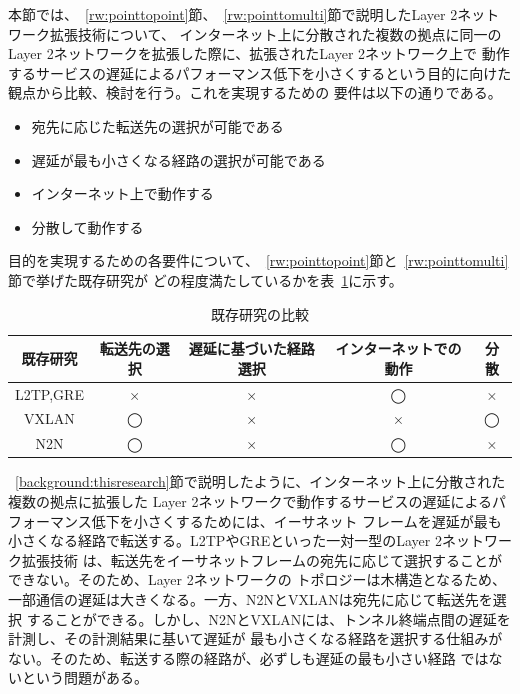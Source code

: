 本節では、~\ref{rw:pointtopoint}節、~\ref{rw:pointtomulti}節で説明したLayer 2ネットワーク拡張技術について、
インターネット上に分散された複数の拠点に同一のLayer 2ネットワークを拡張した際に、拡張されたLayer 2ネットワーク上で
動作するサービスの遅延によるパフォーマンス低下を小さくするという目的に向けた観点から比較、検討を行う。これを実現するための
要件は以下の通りである。

\begin{itemize}
	\item{宛先に応じた転送先の選択が可能である}
	\item{遅延が最も小さくなる経路の選択が可能である}
	\item{インターネット上で動作する}
	\item{分散して動作する}
\end{itemize}

目的を実現するための各要件について、~\ref{rw:pointtopoint}節と~\ref{rw:pointtomulti}節で挙げた既存研究が
どの程度満たしているかを表~\ref{table:relatedworks}に示す。

\begin{table}[h]
	\begin{center}
		\caption{既存研究の比較}
		\begin{tabular}{|c|c|c|c|c|}
			\hline
			既存研究 & 転送先の選択 & 遅延に基づいた経路選択 & インターネットでの動作 & 分散 \\
			\hline
			\hline
			L2TP,GRE & × & × & ◯ & × \\
			VXLAN & ◯ & × & × & ◯ \\
			N2N & ◯ & × & ◯ & × \\
			\hline
		\end{tabular}
		\label{table:relatedworks}
	\end{center}
\end{table}

~\ref{background:thisresearch}節で説明したように、インターネット上に分散された複数の拠点に拡張した
Layer 2ネットワークで動作するサービスの遅延によるパフォーマンス低下を小さくするためには、イーサネット
フレームを遅延が最も小さくなる経路で転送する。L2TPやGREといった一対一型のLayer 2ネットワーク拡張技術
は、転送先をイーサネットフレームの宛先に応じて選択することができない。そのため、Layer 2ネットワークの
トポロジーは木構造となるため、一部通信の遅延は大きくなる。一方、N2NとVXLANは宛先に応じて転送先を選択
することができる。しかし、N2NとVXLANには、トンネル終端点間の遅延を計測し、その計測結果に基いて遅延が
最も小さくなる経路を選択する仕組みがない。そのため、転送する際の経路が、必ずしも遅延の最も小さい経路
ではないという問題がある。

